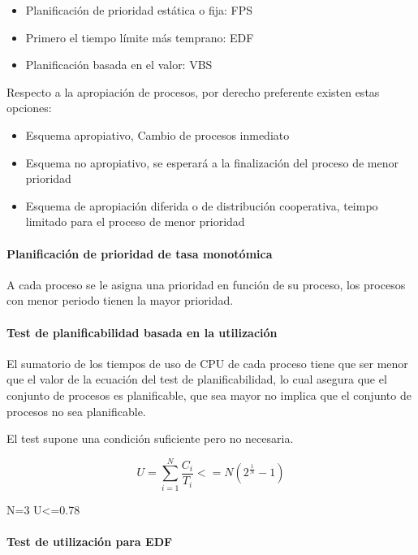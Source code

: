 \begin{itemize}
	\item Planificación de prioridad estática o fija: FPS
	\item Primero el tiempo límite más temprano: EDF
	\item Planificación basada en el valor: VBS
\end{itemize}

Respecto a la apropiación de procesos, por derecho preferente existen estas
opciones:

\begin{itemize}
	\item Esquema apropiativo, Cambio de procesos inmediato
	\item Esquema no apropiativo, se esperará a la finalización del proceso
		de menor prioridad
	\item Esquema de apropiación diferida o de distribución cooperativa,
		teimpo limitado para el proceso de menor prioridad
\end{itemize}

\paragraph{Planificación de prioridad de tasa monotómica}

A cada proceso se le asigna una prioridad en función de su proceso, los procesos
con menor periodo tienen la mayor prioridad.

\paragraph{Test de planificabilidad basada en la utilización}

El sumatorio de los tiempos de uso de CPU de cada proceso tiene que ser menor
que el valor de la ecuación del test de planificabilidad, lo cual asegura que
el conjunto de procesos es planificable, que sea mayor no implica que el
conjunto de procesos no sea planificable.

El test supone una condición suficiente pero no necesaria.

\begin{equation}\label{key}
	U=\sum_{i=1}^{N}\frac{C_{i}}{T_{i}}<=N(2^{\frac{1}{N}}-1)
\end{equation}

N=3 U<=0.78

\paragraph{Test de utilización para EDF}

